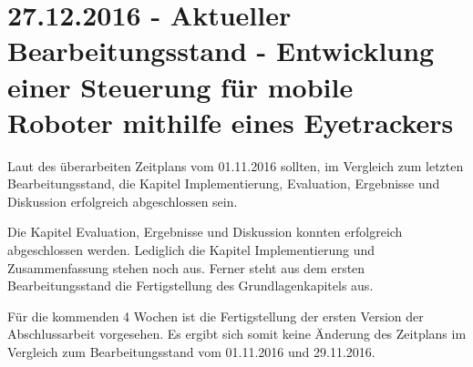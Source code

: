 \documentclass[11pt,a4paper,onecolumn,twoside,ngerman]{book}
\begin{document}
\section*{27.12.2016 - Aktueller Bearbeitungsstand - Entwicklung einer Steuerung für mobile Roboter mithilfe eines Eyetrackers}

Laut des überarbeiten Zeitplans vom 01.11.2016 sollten, im Vergleich zum letzten Bearbeitungsstand, die Kapitel Implementierung, Evaluation, Ergebnisse und Diskussion erfolgreich abgeschlossen sein. 

Die Kapitel Evaluation, Ergebnisse und Diskussion konnten erfolgreich abgeschlossen werden. Lediglich die Kapitel Implementierung und Zusammenfassung stehen noch aus. Ferner steht aus dem ersten Bearbeitungsstand die Fertigstellung des  Grundlagenkapitels aus.

Für die kommenden 4 Wochen ist die Fertigstellung der ersten Version der Abschlussarbeit vorgesehen. Es ergibt sich somit keine Änderung des Zeitplans im Vergleich zum Bearbeitungsstand vom 01.11.2016 und 29.11.2016.
\end{document}
